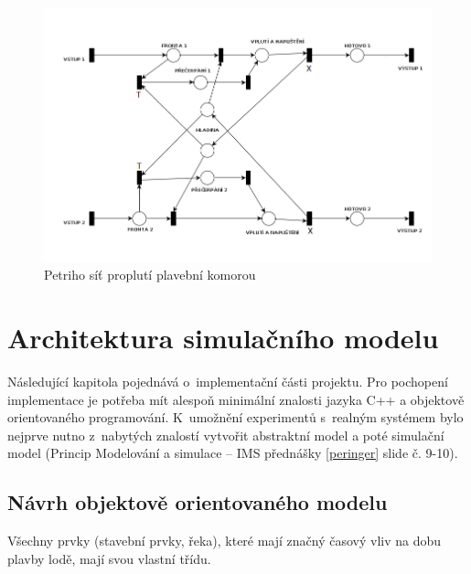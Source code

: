 \documentclass[11pt,a4paper]{article}
\begin{document}
      \begin{figure}[H]
        \centering
        \includegraphics[width=1\textwidth, natwidth=940, natheight=325]
                        {petri_net_2.png}
        \caption{Petriho síť proplutí plavební komorou \label{petri_2}}
      \end{figure}

  \section{Architektura simulačního modelu}

    Následující kapitola pojednává o~implementační části projektu. Pro pochopení
    implementace je potřeba mít alespoň minimální znalosti jazyka C++ a 
    objektově orientovaného programování.
    K~umožnění experimentů s~realným systémem bylo nejprve nutno z~nabytých znalostí
    vytvořit abstraktní model a poté simulační model (Princip Modelování a 
    simulace -- IMS přednášky \ref{peringer} slide č. 9-10).

    \subsection{Návrh objektově orientovaného modelu}
    
      Všechny prvky (stavební prvky, řeka), které mají značný časový vliv na
      dobu plavby lodě, mají svou vlastní třídu.
\end{document}
